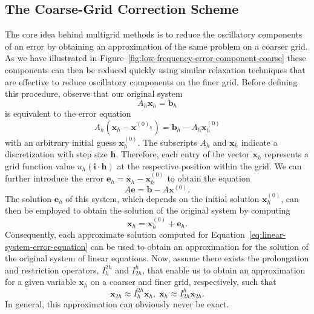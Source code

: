 \subsection{The Coarse-Grid Correction Scheme}
The core idea behind multigrid methods is to reduce the oscillatory components of an error by obtaining an approximation of the same problem on a coarser grid.
As we have illustrated in Figure~\ref{fig:low-frequency-error-component-coarse} these components can then be reduced quickly using similar relaxation techniques that are effective to reduce oscillatory components on the finer grid.
Before defining this procedure, observe that our original system
\begin{equation}
	A_h \bm{x}_h = \bm{b}_h
\end{equation}
is equivalent to the error equation
\begin{equation}
	A_h \left(\bm{x}_h - \bm {x}^{(0)_h}\right) = \bm{b}_h - A_h \bm{x}^{(0)}_h
\end{equation}
with an arbitrary initial guess $\bm{x}^{(0)}_h$.
The subscripts $A_h$ and $\bm{x}_h$ indicate a discretization with step size $\bm{h}$.
Therefore, each entry of the vector $\bm{x}_h$ represents a grid function value $u_h(\bm{i} \cdot \bm{h})$ at the respective position within the grid.
We can further introduce the error $\bm{e}_h = \bm{x}_h - \bm {x}^{(0)}_h$ to obtain the equation
\begin{equation}
	A \bm{e} = \bm{b} - A \bm{x}^{(0)}.
	\label{eq:linear-system-error-equation}
\end{equation}
The solution $\bm{e}_h$ of this system, which depends on the initial solution $\bm{x}^{(0)}_h$, can then be employed to obtain the solution of the original system by computing
\begin{equation}
	\bm{x}_h = \bm{x}^{(0)}_h + \bm{e}_h.
\end{equation}
Consequently, each approximate solution computed for Equation~\eqref{eq:linear-system-error-equation} can be used to obtain an approximation for the solution of the original system of linear equations.
Now, assume there exists the prolongation and restriction operators, $I_h^{2h}$ and $I_{2h}^h$, that enable us to obtain an approximation for a given variable $\bm{x}_h$ on a coarser and finer grid, respectively, such that
\begin{equation}
	\bm{x}_{2h} \approx I_h^{2h} \bm{x}_{h}, \;
	\bm{x}_{h} \approx I_{2h}^{h} \bm{x}_{2h}. 
\end{equation}
In general, this approximation can obviously never be exact.
